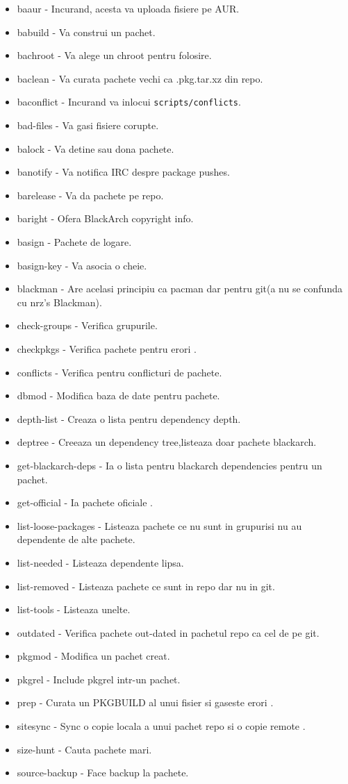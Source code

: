 \documentclass[a4paper, oneside, 11pt]{book}
\begin{document}
\begin{itemize}
\item baaur - Incurand, acesta va uploada fisiere pe  AUR.
\item babuild - Va construi un pachet.
\item bachroot - Va alege un chroot pentru folosire.
\item baclean - Va curata pachete vechi ca .pkg.tar.xz din  repo.
\item baconflict - Incurand va inlocui \verb|scripts/conflicts|.
\item bad-files - Va gasi fisiere corupte.
\item balock - Va detine sau dona pachete.
\item banotify - Va notifica IRC despre package pushes.
\item barelease - Va da pachete pe repo.
\item baright - Ofera  BlackArch copyright info.
\item basign - Pachete de logare.
\item basign-key - Va asocia o cheie.
\item blackman - Are acelasi principiu ca pacman dar pentru git(a nu se confunda cu nrz's Blackman).
\item check-groups - Verifica grupurile.
\item checkpkgs - Verifica pachete pentru erori .
\item conflicts - Verifica pentru conflicturi de pachete.
\item dbmod - Modifica baza de date pentru pachete.
\item depth-list - Creaza o lista pentru dependency depth.
\item deptree - Creeaza un dependency tree,listeaza doar pachete blackarch.
\item get-blackarch-deps - Ia o lista pentru blackarch dependencies pentru un pachet.
\item get-official - Ia pachete oficiale .
\item list-loose-packages - Listeaza pachete ce nu sunt in grupurisi nu au dependente de alte pachete.
\item list-needed - Listeaza dependente lipsa.
\item list-removed - Listeaza pachete ce sunt in  repo dar nu in git.
\item list-tools - Listeaza  unelte.
\item outdated - Verifica pachete out-dated in pachetul repo ca cel de pe git.
\item pkgmod - Modifica un pachet creat.
\item pkgrel - Include pkgrel intr-un pachet.
\item prep - Curata un PKGBUILD al unui fisier si gaseste erori .
\item sitesync - Sync o copie locala a unui pachet repo si o copie remote .
\item size-hunt - Cauta pachete mari.
\item source-backup - Face backup la pachete.
\end{itemize}
\end{document}
